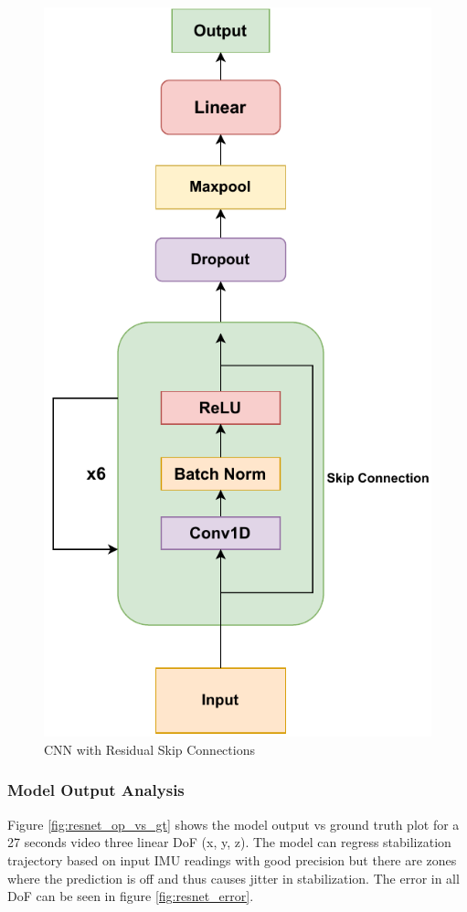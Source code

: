 \begin{figure}[H]
    \centering
    \includegraphics[scale=0.85]{images/fig_chapter2/nns/resnet_mt.pdf}
    \caption{CNN with Residual Skip Connections}
    \label{fig:resnet_used}
\end{figure}

\subsubsection{Model Output Analysis}
Figure \ref{fig:resnet_op_vs_gt} shows the model output vs ground truth plot for a 27 seconds video three linear DoF (x, y, z). The model can regress stabilization trajectory based on input IMU readings with good precision but there are zones where the prediction is off and thus causes jitter in stabilization. The error in all DoF can be seen in figure \ref{fig:resnet_error}.

